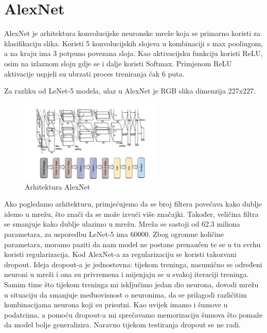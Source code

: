 \section{AlexNet}\label{sec:alexnet}
AlexNet je arhitektura konvolucijske neuronske mreže koja se primarno koristi za klasifikaciju slika. Koristi 5 konvolucijskih slojeva u kombinaciji s max poolingom, a na kraju ima 3 potpuno povezana sloja. Kao aktivacijsku funkciju koristi ReLU, osim na izlaznom sloju gdje se i dalje koristi Softmax. Primjenom ReLU aktivacije uspjeli su ubrzati proces treniranja čak 6 puta.

Za razliku od LeNet-5 modela, ulaz u AlexNet je RGB slika dimenzija 227x227.
\FloatBarrier
\begin{figure}[h]
    \centering
    \includegraphics[width=0.6\textwidth]{images/AlexNet}
    \caption{Arhitektura AlexNet}
    \label{fig:slika9}
\end{figure}
\FloatBarrier

Ako pogledamo arhitekturu, primjećujemo da se broj filtera povećava kako dublje idemo u mrežu, što znači da se može izvući više značajki.
Također, veličina filtra se smanjuje kako dublje ulazimo u mrežu.
Mreža se sastoji od 62.3 miliona parametara, za usporedbu LeNet-5 ima 60000.
Zbog ogromne količine parametara, moramo paziti da nam model ne postane prenaučen te se u tu svrhu koristi regularizacija.
Kod AlexNet-a za regularizaciju se koristi takozvani dropout.
Ideja dropout-a je jednostovna: tijekom treninga, nasumično se  određeni neuroni u mreži i ona su privremena i mijenjaju se u svakoj iteraciji treninga.
Samim time što tijekom treninga mi isključimo jedan dio neurona, dovodi mrežu u situaciju da smanjuje međuovisnost o neuronima, da se prilagodi različitim kombinacijama neurona koji su prisutni.
Kao uvijek imamo i šumove u podatcima, a pomoću dropout-a mi sprečavamo memorizaciju šumova što pomaže da model bolje generalizira.
Naravno tijekom testiranja dropout se ne radi.


